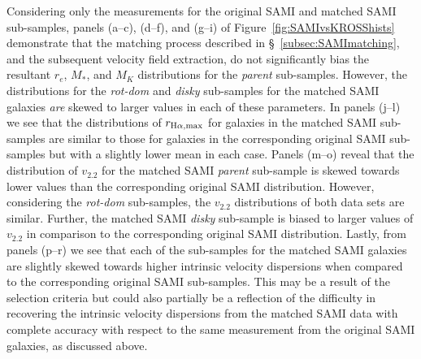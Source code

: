 \documentclass[a4paper,fleqn,usenatbib]{mnras}
\begin{document}
{Considering only the measurements for the original SAMI and matched SAMI sub-samples, panels (a--c), (d--f), and (g--i) of Figure~\ref{fig:SAMIvsKROSShists} demonstrate that the matching process described in \S~\ref{subsec:SAMImatching}, and the subsequent velocity field extraction, do not significantly bias the resultant $r_{e}$, $M_{*}$, and $M_{K}$ distributions for the \textit{parent} sub-samples. However, the distributions for the \textit{rot-dom} and \textit{disky} sub-samples for the matched SAMI galaxies {\it are} skewed to larger values in each of these parameters. In panels (j--l) we see that the distributions of $r_{\rm{H}\alpha,\rm{max}}$ for galaxies in the matched SAMI sub-samples are similar to those for galaxies in the corresponding original SAMI sub-samples but with a slightly lower mean in each case. Panels (m--o) reveal that the distribution of $v_{2.2}$ for the matched SAMI \textit{parent} sub-sample is skewed towards lower values than the corresponding original SAMI distribution. However, considering the \textit{rot-dom} sub-samples, the $v_{2.2}$ distributions of both data sets are similar. Further, the matched SAMI \textit{disky} sub-sample is biased to larger values of $v_{2.2}$ in comparison to the corresponding original SAMI distribution. Lastly, from panels (p--r) we see that each of the sub-samples for the matched SAMI galaxies are slightly skewed towards higher intrinsic velocity dispersions when compared to the corresponding original SAMI sub-samples. This may be a result of the selection criteria but could also partially be a reflection of the difficulty in recovering the intrinsic velocity dispersions from the matched SAMI data with complete accuracy with respect to the same measurement from the original SAMI galaxies, as discussed above.

}
\end{document}
